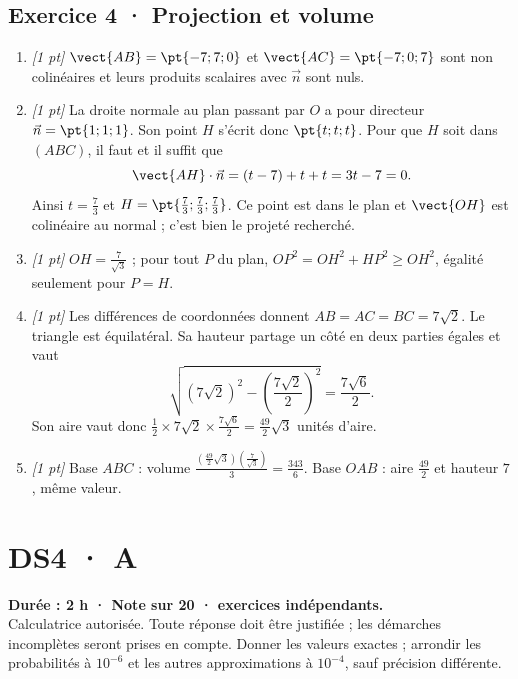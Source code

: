 \subsection*{Exercice 4 · Projection et volume}\begin{enumerate}

\item \textit{[1 pt]} $\vect{AB}=\pt{-7;7;0}$ et $\vect{AC}=\pt{-7;0;7}$ sont non colinéaires et leurs produits scalaires avec $\vec n$ sont nuls.

\item \textit{[1 pt]} La droite normale au plan passant par $O$ a pour directeur $\vec n=\pt{1;1;1}$. Son point $H$ s'écrit donc $\pt{t;t;t}$. Pour que $H$ soit dans $(ABC)$, il faut et il suffit que
\[\vect{AH}\cdot\vec n=(t-7)+t+t=3t-7=0.\]
Ainsi $t=\frac{7}{3}$ et $H=\pt{\frac{7}{3};\frac{7}{3};\frac{7}{3}}$. Ce point est dans le plan et $\vect{OH}$ est colinéaire au normal ; c'est bien le projeté recherché.

\item \textit{[1 pt]} $OH=\frac{7}{\sqrt{3}}$ ; pour tout $P$ du plan, $OP^2=OH^2+HP^2\ge OH^2$, égalité seulement pour $P=H$.

\item \textit{[1 pt]} Les différences de coordonnées donnent $AB=AC=BC=7\sqrt2$. Le triangle est équilatéral. Sa hauteur partage un côté en deux parties égales et vaut
\[\sqrt{(7\sqrt2)^2-(\frac{7\sqrt{2}}{2})^2}=\frac{7\sqrt6}{2}.\]
Son aire vaut donc $\frac12\times 7\sqrt2\times\frac{7\sqrt6}{2}=\frac{49}{2}\sqrt3$ unités d'aire.

\item \textit{[1 pt]} Base $ABC$ : volume $\frac{(\frac{49}{2}\sqrt3)(\frac{7}{\sqrt{3}})}{3}=\frac{343}{6}$. Base $OAB$ : aire $\frac{49}{2}$ et hauteur $7$, même valeur.

\end{enumerate}

\fi

\ifmxteacher

\mxnewpage{}\label{sujet:6-3}

\section*{DS4 · A}


\textbf{Durée : 2 h · Note sur 20 ·  exercices indépendants.}\\Calculatrice autorisée. Toute réponse doit être justifiée ; les démarches incomplètes seront prises en compte. Donner les valeurs exactes ; arrondir les probabilités à $10^{-6}$ et les autres approximations à $10^{-4}$, sauf précision différente.

